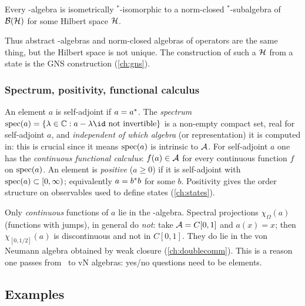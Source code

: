 \begin{theorem}
Every \cstar-algebra is isometrically $^*$-isomorphic to a norm-closed $^*$-subalgebra of $\mathcal{B}(\mathcal{H})$ for some Hilbert space $\mathcal{H}$.
\end{theorem}
Thus abstract \cstar-algebras and norm-closed algebras of operators are the same thing, but the Hilbert space is not unique. The construction of such a $\mathcal{H}$ from a state is the GNS construction (\cref{ch:gns}).

\subsubsection*{Spectrum, positivity, functional calculus}
An element $a$ is self-adjoint if $a=a^{*}$. The \emph{spectrum} $\spec(a)=\{\lambda\in\C:a-\lambda\id\text{ not invertible}\}$ is a non-empty compact set, real for self-adjoint $a$, and \emph{independent of which algebra} (or representation) it is computed in: this is crucial since it means $\operatorname{spec}(a)$ is intrinsic to $\mathcal{A}$. For self-adjoint $a$ one has the \emph{continuous functional calculus}: $f(a)\in\mathcal{A}$ for every continuous function $f$ on $\operatorname{spec}(a)$. An element is \emph{positive} ($a\ge0$) if it is self-adjoint with $\operatorname{spec}(a)\subset[0,\infty)$; equivalently $a=b^{*} b$ for some $b$. Positivity gives the order structure on observables used to define states (\cref{ch:states}).

\begin{whatwrong}
Only \emph{continuous} functions of $a$ lie in the \cstar-algebra. Spectral projections $\chi_\Omega(a)$ (functions with jumps), in general do \emph{not}: take $\mathcal{A}=C[0,1]$ and $a(x)=x$; then $\chi_{[0,1/2]}(a)$ is discontinuous and not in $C[0,1]$. They do lie in the von Neumann algebra obtained by weak closure (\cref{ch:doublecomm}). This is a reason one passes from \cstar\ to vN algebras: yes/no questions need to be elements.
\end{whatwrong}

\subsection{Examples}

